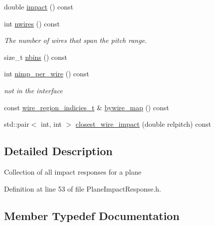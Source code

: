 \begin{DoxyCompactItemize}
\item 
double \hyperlink{class_wire_cell_1_1_gen_1_1_plane_impact_response_ae0d3d3611d894db56f398abbf67d3373}{impact} () const
\item 
int \hyperlink{class_wire_cell_1_1_gen_1_1_plane_impact_response_a8fc3604f6bd80d29095f205c59b768c2}{nwires} () const
\begin{DoxyCompactList}\small\item\em The number of wires that span the pitch range. \end{DoxyCompactList}\item 
size\+\_\+t \hyperlink{class_wire_cell_1_1_gen_1_1_plane_impact_response_ae6ff423372c28e1fec5e13a47d1648d2}{nbins} () const
\item 
int \hyperlink{class_wire_cell_1_1_gen_1_1_plane_impact_response_a0b1b68468b3987429e394680deb33c76}{nimp\+\_\+per\+\_\+wire} () const
\begin{DoxyCompactList}\small\item\em not in the interface \end{DoxyCompactList}\item 
const \hyperlink{class_wire_cell_1_1_gen_1_1_plane_impact_response_a383b0ed60a99682b46afeb5ecb446078}{wire\+\_\+region\+\_\+indicies\+\_\+t} \& \hyperlink{class_wire_cell_1_1_gen_1_1_plane_impact_response_aae6cf57460996098bba052af6793a6de}{bywire\+\_\+map} () const
\item 
std\+::pair$<$ int, int $>$ \hyperlink{class_wire_cell_1_1_gen_1_1_plane_impact_response_a205df947b332100ddf1179b58b46f47e}{closest\+\_\+wire\+\_\+impact} (double relpitch) const
\end{DoxyCompactItemize}


\subsection{Detailed Description}
Collection of all impact responses for a plane 

Definition at line 53 of file Plane\+Impact\+Response.\+h.



\subsection{Member Typedef Documentation}
\mbox{\label{class_wire_cell_1_1_gen_1_1_plane_impact_response_a76147eaef10e6fe542bf25d85acc40f7}} 
